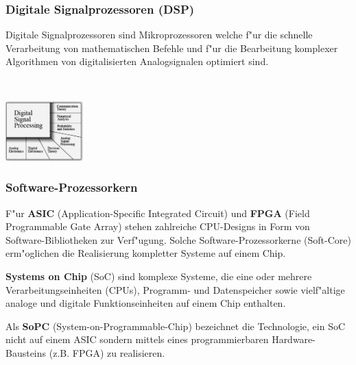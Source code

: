 \begin{minipage}{9cm}
	\subsubsection{Digitale Signalprozessoren (DSP)}
	Digitale Signalprozessoren sind Mikroprozessoren welche f"ur die schnelle Verarbeitung von mathematischen Befehle und f"ur die Bearbeitung komplexer Algorithmen von digitalisierten Analogsignalen optimiert sind.
\end{minipage}
%
\begin{minipage}{0.5cm}
	\ \
\end{minipage}
%
\begin{minipage}{9cm}
	\includegraphics[width=3cm]{pics/Digitale-Signalprozessoren}
\end{minipage}

\subsubsection{Software-Prozessorkern}
	F"ur \textbf{ASIC} (Application-Specific Integrated Circuit) und \textbf{FPGA} (Field Programmable Gate Array) stehen zahlreiche CPU-Designs in Form von Software-Bibliotheken zur Verf"ugung. Solche Software-Prozessorkerne (Soft-Core) erm"oglichen die Realisierung kompletter Systeme auf einem Chip.

\textbf{Systems on Chip} (SoC) sind komplexe Systeme, die eine oder mehrere Verarbeitungseinheiten (CPUs), Programm- und Datenspeicher sowie vielf"altige analoge und digitale Funktionseinheiten auf einem Chip enthalten.

Als \textbf{SoPC} (System-on-Programmable-Chip) bezeichnet die Technologie, ein SoC nicht auf einem ASIC sondern mittels eines programmierbaren Hardware-Bausteins (z.B. FPGA) zu realisieren.


